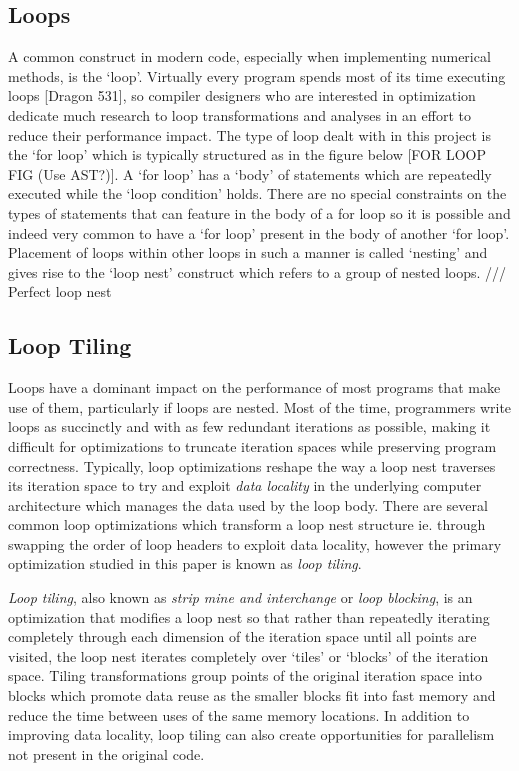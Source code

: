 \documentclass[a4paper,12pt,twoside]{report}
\begin{document}
\subsection*{Loops}
A common construct in modern code, especially when implementing numerical methods, is the `loop'. Virtually every program spends most of its 
time executing loops [Dragon 531], so compiler designers who are interested in optimization dedicate much research to 
loop transformations and analyses in an effort to reduce their performance impact. The type of loop dealt with in this project is the
`for loop' which is typically structured as in the figure below [FOR LOOP FIG (Use AST?)]. A `for loop' has a `body' of statements which are repeatedly executed
while the `loop condition' holds. There are no special constraints on the types of statements that can feature in the body of a for loop so it
is possible and indeed very common to have a `for loop' present in the body of another `for loop'. Placement of loops within other loops in such a manner
	is called `nesting' and gives rise to the `loop nest' construct which refers to a group of nested loops. /// Perfect loop nest

\subsection*{Loop Tiling}
Loops have a dominant impact on the performance of most programs that make use of them, particularly if loops are nested.
Most of the time, programmers write loops as succinctly and with as few redundant iterations as possible, making it difficult
for optimizations to truncate iteration spaces while preserving program correctness. Typically, loop optimizations reshape the
way a loop nest traverses its iteration space to try and exploit \textit{data locality} in the underlying computer architecture which
manages the data used by the loop body. There are several common loop optimizations which transform a loop nest structure ie. through
swapping the order of loop headers to exploit data locality, however the primary optimization studied in this paper is known as
\textit{loop tiling}.

\textit{Loop tiling}, also known as \textit{strip mine and interchange} or \textit{loop blocking}, is an optimization that modifies 
a loop nest so that rather than repeatedly iterating completely through each dimension of the iteration space until all points are
visited, the loop nest iterates completely over `tiles' or `blocks' of the iteration space. Tiling transformations group points of
the original iteration space into blocks which promote data reuse as the smaller blocks fit into fast memory and reduce the time between
uses of the same memory locations. In addition to improving data locality, loop tiling can also create opportunities for parallelism not 
present in the original code.
\end{document}
